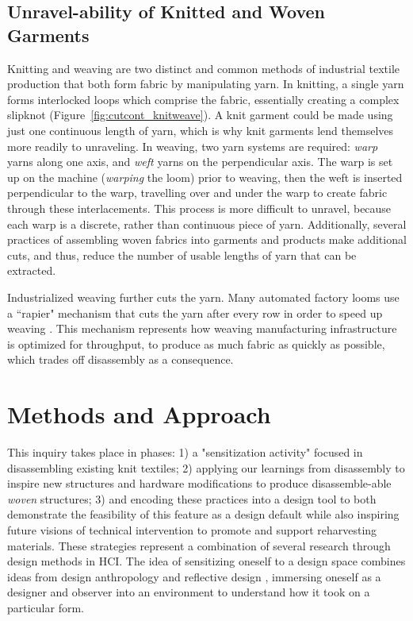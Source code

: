 \documentclass{sigchi}
\begin{document}
\subsection{Unravel-ability of Knitted and Woven Garments}
Knitting and weaving are two distinct and common methods of industrial textile production that both form fabric by manipulating yarn. In knitting, a single yarn forms interlocked loops which comprise the fabric, essentially creating a complex slipknot (Figure~\ref{fig:cutcont_knitweave}). A knit garment could be made using just one continuous length of yarn, which is why knit garments lend themselves more readily to unraveling. In weaving, two yarn systems are required: \emph{warp} yarns along one axis, and \emph{weft} yarns on the perpendicular axis. The warp is set up on the machine (\emph{warping} the loom) prior to weaving, then the weft is inserted perpendicular to the warp, travelling over and under the warp to create fabric through these interlacements. This process is more difficult to unravel, because each warp is a discrete, rather than continuous piece of yarn. Additionally, several practices of assembling woven fabrics into garments and products make additional cuts, and thus, reduce the number of usable lengths of yarn that can be extracted.
 
Industrialized weaving further cuts the yarn. Many automated factory looms use a ``rapier" mechanism that cuts the yarn after every row in order to speed up weaving \cite{engineers_complete_2017}. This mechanism represents how weaving manufacturing infrastructure is optimized for throughput, to produce as much fabric as quickly as possible, which trades off disassembly as a consequence.


\section{Methods and Approach}

This inquiry takes place in phases: 1) a "sensitization activity" focused in disassembling existing knit textiles; 2) applying our learnings from disassembly to inspire new structures and hardware modifications to produce disassemble-able \textit{woven} structures; 3) and encoding these practices into a design tool to both demonstrate the feasibility of this feature as a design default while also inspiring future visions of technical intervention to promote and support reharvesting materials. These strategies represent a combination of several research through design methods in HCI. The idea of sensitizing oneself to a design space combines ideas from design anthropology \cite{smith_design_2016} and reflective design \cite{sengers_reflective_2005}, immersing oneself as a designer and observer into an environment to understand how it took on a particular form.
\end{document}
